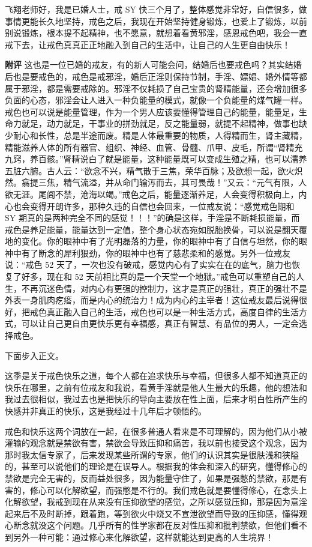 \begin{case}
    飞翔老师好，我是已婚人士，戒 SY 快三个月了，整体感觉非常好，自信很多，做事情更能长久地坚持，戒色之后，我现在开始坚持健身锻炼，也爱上了锻炼，以前别说锻炼，根本提不起精神，也不愿意，就想着看黄邪淫，感恩戒色吧，我会一直戒下去，让戒色真真正正地融入到自己的生活中，让自己的人生更自由快乐！

    \textbf{附评} 这也是一位已婚的戒友，有的新人可能会问，结婚后也要戒色吗？其实结婚后也是要戒色的，戒色是戒邪淫，婚后正淫则保持节制，手淫、嫖娼、婚外情等都属于邪淫，都是需要戒除的。邪淫不仅耗损了自己宝贵的肾精能量，还会增加很多负面的心态，邪淫会让人进入一种负能量的模式，就像一个负能量的煤气罐一样。戒色也可以说是能量管理，作为一个男人应该要懂得管理自己的能量，能量足，生命力就足，动力就足，干事业的拼劲就足，反之能量弱，就提不起精神，做事也缺少耐心和长性，总是半途而废。精是人体最重要的物质，人得精而生，肾主藏精，精能滋养人体的所有器官、组织、神经、血管、骨髓、爪甲、皮毛，所谓“肾精充九窍，养百骸。”肾精说白了就是能量，这种能量既可以变成生殖之精，也可以濡养五脏六腑。古人云：“欲念不兴，精气散于三焦，荣华百脉；及欲想一起，欲火炽然。翕提三焦，精气流溢，并从命门输泻而去，其可畏哉！”又云：“元气有限，人欲无涯。尾闾不禁，沧海以竭。”戒色之后，能量逐渐养足，人会变得积极向上，内心也会变得开朗许多，那种久违的自信也会回来，一位戒友说：“感觉戒色期和 SY 期真的是两种完全不同的感觉！！！”的确是这样，手淫是不断耗损能量，而戒色是养足能量，能量达到一定值，整个身心状态宛如脱胎换骨，可以说是翻天覆地的变化。你的眼神中有了光明磊落的力量，你的眼神中有了自信与坦然，你的眼神中有了断念的犀利狠劲，你的眼神中也有了慈悲柔和的感觉。另外一位戒友说：“戒色 52 天了，一次也没有破戒，感觉内心有了实实在在的底气，脑力也恢复了好多，现在和 52 天前相比真的是一个天堂一个地狱。”戒色可以重塑自己的人生，不再沉迷色情，对内心有更强的控制力，这才是真正的强壮，真正的强壮不是外表一身肌肉疙瘩，而是内心的统治力！成为内心的主宰者！这位戒友最后说得很好，把戒色真正融入自己的生活，戒色也可以是一种生活方式，高度自律的生活方式，可以让自己更自由更快乐更有幸福感，真正有智慧、有品位的男人，一定会选择戒色。
\end{case}

下面步入正文。

这季是关于戒色快乐之道，每个人都在追求快乐与幸福，但很多人都不知道真正的快乐在哪里，之前有位戒友和我说，看黄手淫就是他人生最大的乐趣，他的想法和我过去很相似，我过去也是把快乐的导向主要放在性上面，后来才明白性所产生的快感并非真正的快乐，这是我经过十几年后才顿悟的。

戒色和快乐这两个词放在一起，在很多普通人看来是不可理解的，因为他们从小被灌输的观念就是禁欲有害，禁欲会导致压抑和痛苦，我以前也接受这个观念，因为那时我太信专家了，后来发现某些所谓的专家，他们的认识其实是很肤浅和狭隘的，甚至可以说他们的理论是在误导人。根据我的体会和深入的研究，懂得修心的禁欲是完全无害的，反而益处很多，因为能量守住了，如果是强憋的禁欲，那是有害的，修心可以化解欲望，而强憋是不行的。我们戒色就是要懂得修心，在念头上化解欲望，我戒到现在从来没有压抑欲望的感觉，之所以感觉压抑，那是因为意淫起来后不及时断掉，跟着跑，等到欲火中烧又不宣泄欲望而导致的压抑感，懂得观心断念就没这个问题。几乎所有的性学家都在反对性压抑和批判禁欲，但他们看不到另外一种可能：通过修心来化解欲望，这样就能达到更高的人生境界！

